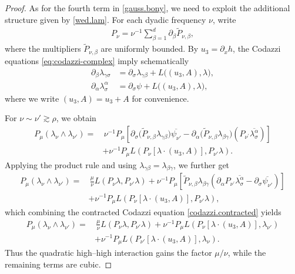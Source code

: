 \documentclass[10pt,a4paper]{amsart}
\begin{document}
\begin{proof}
As for the fourth term in \eqref{gauss.bony}, we  need to exploit the additional structure  given by \eqref{wed.lam}. For each dyadic frequency \(\nu\), write
\begin{align}
P_\nu
=
\nu^{-1}
\sum_{\beta=1}^d
\partial_\beta\widetilde P_{\nu,\beta},
\label{Pnu.derivative}
\end{align}
where the multipliers \(\widetilde P_{\nu,\beta}\) are uniformly bounded.
By \(u_3=\partial_xh\), the Codazzi equations \eqref{eq:codazzi-complex} imply schematically
\begin{align}
\partial_\beta\lambda_{\gamma\sigma}
&=
\partial_\sigma\lambda_{\gamma\beta}
+
L\bigl((u_3,A),\lambda\bigr),
\label{codazzi.one}
\\
\partial_\alpha\lambda^\alpha_\sigma
&=
\partial_\sigma\psi
+
L\bigl((u_3,A),\lambda\bigr),
\label{codazzi.contracted}
\end{align}
where we write \( (u_3,A)=u_3+A\) for convenience.

For \(\nu\sim\nu'\gtrsim\rho\), we obtain
\begin{align*}
P_\mu(\lambda_\nu\wedge\lambda_{\nu'})
=&\,
\nu^{-1}P_\mu
\left[
\partial_\sigma
\bigl(\widetilde P_{\nu,\beta}\lambda_{\gamma\beta}\bigr)
\overline{\psi_{\nu'}}
-
\partial_\alpha
\bigl(\widetilde P_{\nu,\beta}\lambda_{\beta\gamma}\bigr)
(P_{\nu^\prime}\overline{\lambda^\alpha _{\sigma}})
\right]
\\
&+
\nu^{-1}P_\mu
L\left(
P_\nu[\lambda\cdot(u_3,A)],
P_{\nu'}\lambda
\right).
\end{align*}
Applying the product rule and using
\(\lambda_{\gamma\beta}=\lambda_{\beta\gamma}\), we further get
\begin{align*}
P_\mu(\lambda_\nu\wedge\lambda_{\nu'})
=&\,
\frac{\mu}{\nu}
L(P_\nu\lambda,P_{\nu'}\lambda)
+
\nu^{-1}P_\mu
\left[
\widetilde P_{\nu,\beta}\lambda_{\beta\gamma}
\left(
\partial_\alpha P_{\nu^\prime}\overline{\lambda^\alpha _{\sigma}}
-
\partial_\sigma\overline{\psi_{\nu'}}
\right)
\right]
\\
&+
\nu^{-1}P_\mu
L\left(
P_\nu[\lambda\cdot(u_3,A)],
P_{\nu'}\lambda
\right),
\end{align*}
which combining the contracted Codazzi equation \eqref{codazzi.contracted}
yields
\begin{align}
P_\mu(\lambda_\nu\wedge\lambda_{\nu'})
=&\,
\frac{\mu}{\nu}
L(P_\nu\lambda,P_{\nu'}\lambda)+
\nu^{-1}P_\mu
L\left(
P_\nu[\lambda\cdot(u_3,A)],
\lambda_{\nu'}
\right)
\label{gauss.high.high.identity}
\\
&
 +
\nu^{-1}P_\mu
L\left(
P_{\nu'}[\lambda\cdot(u_3,A)],
\lambda_\nu
\right).
\nonumber
\end{align}
Thus the quadratic high--high interaction gains the factor
\(\mu/\nu\), while the remaining terms are cubic.


\end{proof}
\end{document}
